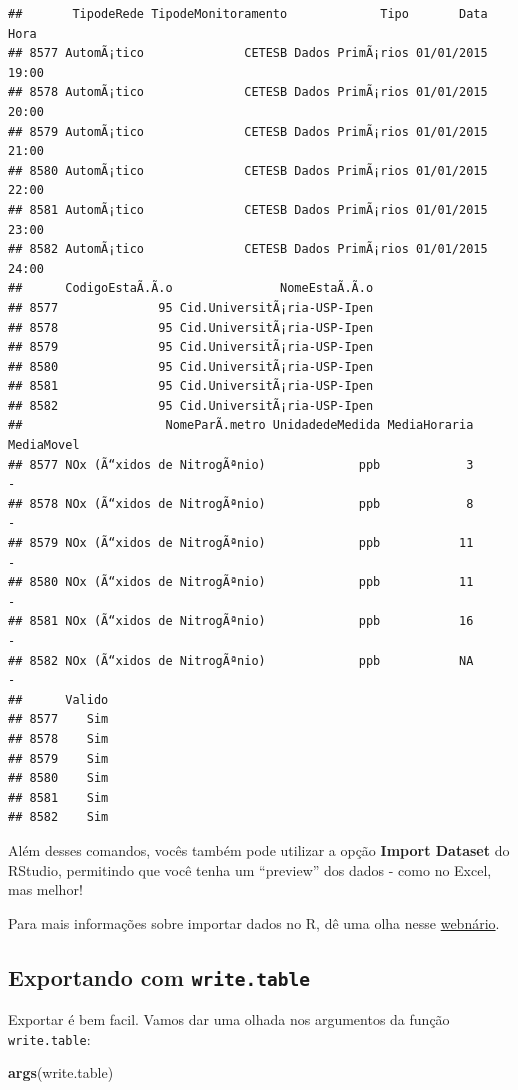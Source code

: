 \documentclass[]{book}
\newenvironment{Shaded}{\begin{snugshade}}{\end{snugshade}}
\newcommand{\KeywordTok}[1]{\textcolor[rgb]{0.13,0.29,0.53}{\textbf{#1}}}
\newcommand{\NormalTok}[1]{#1}
\theoremstyle{definition}
\theoremstyle{definition}
\theoremstyle{definition}
\theoremstyle{remark}
\begin{document}
\begin{verbatim}
##       TipodeRede TipodeMonitoramento             Tipo       Data  Hora
## 8577 AutomÃ¡tico              CETESB Dados PrimÃ¡rios 01/01/2015 19:00
## 8578 AutomÃ¡tico              CETESB Dados PrimÃ¡rios 01/01/2015 20:00
## 8579 AutomÃ¡tico              CETESB Dados PrimÃ¡rios 01/01/2015 21:00
## 8580 AutomÃ¡tico              CETESB Dados PrimÃ¡rios 01/01/2015 22:00
## 8581 AutomÃ¡tico              CETESB Dados PrimÃ¡rios 01/01/2015 23:00
## 8582 AutomÃ¡tico              CETESB Dados PrimÃ¡rios 01/01/2015 24:00
##      CodigoEstaÃ.Ã.o               NomeEstaÃ.Ã.o
## 8577              95 Cid.UniversitÃ¡ria-USP-Ipen
## 8578              95 Cid.UniversitÃ¡ria-USP-Ipen
## 8579              95 Cid.UniversitÃ¡ria-USP-Ipen
## 8580              95 Cid.UniversitÃ¡ria-USP-Ipen
## 8581              95 Cid.UniversitÃ¡ria-USP-Ipen
## 8582              95 Cid.UniversitÃ¡ria-USP-Ipen
##                    NomeParÃ.metro UnidadedeMedida MediaHoraria MediaMovel
## 8577 NOx (Ã“xidos de NitrogÃªnio)             ppb            3          -
## 8578 NOx (Ã“xidos de NitrogÃªnio)             ppb            8          -
## 8579 NOx (Ã“xidos de NitrogÃªnio)             ppb           11          -
## 8580 NOx (Ã“xidos de NitrogÃªnio)             ppb           11          -
## 8581 NOx (Ã“xidos de NitrogÃªnio)             ppb           16          -
## 8582 NOx (Ã“xidos de NitrogÃªnio)             ppb           NA          -
##      Valido
## 8577    Sim
## 8578    Sim
## 8579    Sim
## 8580    Sim
## 8581    Sim
## 8582    Sim
\end{verbatim}

Além desses comandos, vocês também pode utilizar a opção \textbf{Import
Dataset} do RStudio, permitindo que você tenha um ``preview'' dos dados
- como no Excel, mas melhor!

Para mais informações sobre importar dados no R, dê uma olha nesse
\href{https://www.rstudio.com/resources/webinars/importing-data-into-r/}{webnário}.

\subsection{\texorpdfstring{Exportando com
\texttt{write.table}}{Exportando com write.table}}\label{exportando-com-write.table}

Exportar é bem facil. Vamos dar uma olhada nos argumentos da função
\texttt{write.table}:

\begin{Shaded}
\begin{Highlighting}[]
\KeywordTok{args}\NormalTok{(write.table)}
\end{Highlighting}
\end{Shaded}
\end{document}

